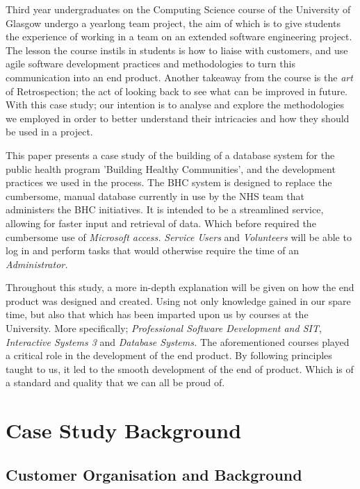 \documentclass{l3proj}
\begin{document}
Third year undergraduates on the Computing Science course of the University of Glasgow undergo a yearlong team project, the aim of which is to give students the experience of working in a team on an extended software engineering project. The lesson the course instils in students is how to liaise with customers, and use agile software development practices and methodologies to turn this communication into an end product. Another takeaway from the course is the \textit{art} of Retrospection; the act of looking back to see what can be improved in future. With this case study; our intention is to analyse and explore the methodologies we employed in order to better understand their intricacies and how they should be used in a project.

This paper presents a case study of the building of a database system for the public health program 'Building Healthy Communities', and the development practices we used in the process. The BHC system is designed to replace the cumbersome, manual database currently in use by the NHS team that administers the BHC initiatives. It is intended to be a streamlined service, allowing for faster input and retrieval of data. Which before required the cumbersome use of \textit{Microsoft access.} \textit{Service Users} and \textit{Volunteers} will be able to log in and perform tasks that would otherwise require the time of an \textit{Administrator.}

Throughout this study, a more in-depth explanation will be given on how the end product was designed and created. Using not only knowledge gained in our spare time, but also that which has been imparted upon us by courses at the University. More specifically; \textit{Professional Software Development and SIT}, \textit{Interactive Systems 3} and \textit{Database Systems.} The aforementioned courses played a critical role in the development of the end product. By following principles taught to us, it led to the smooth development of the end of product. Which is of a standard and quality that we can all be proud of.
\section{Case Study Background}

\subsection{Customer Organisation and Background}
\label{customer}
\end{document}
